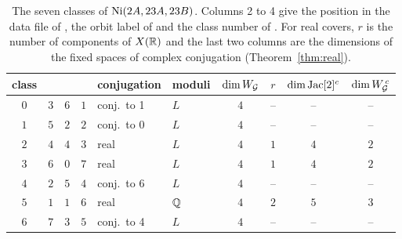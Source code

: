 \begin{table}[ht]
\centering\small
\begin{tabular}{@{}ccccllcccc@{}}
\toprule
class & \cite{HJLPPZ26} & \cite{Janik26} & \cite{LeLay26} & conjugation & moduli & $\dim W_{\mathcal{G}}$ & $r$ & $\dim\operatorname{Jac}[2]^{c}$ & $\dim W_{\mathcal{G}}^{\,c}$\\
\midrule
$0$ & $3$ & $6$ & $1$ & conj.\ to 1 & $L$ & $4$ & -- & -- & --\\
$1$ & $5$ & $2$ & $2$ & conj.\ to 0 & $L$ & $4$ & -- & -- & --\\
$2$ & $4$ & $4$ & $3$ & real & $L$ & $4$ & $1$ & $4$ & $2$\\
$3$ & $6$ & $0$ & $7$ & real & $L$ & $4$ & $1$ & $4$ & $2$\\
$4$ & $2$ & $5$ & $4$ & conj.\ to 6 & $L$ & $4$ & -- & -- & --\\
$5$ & $1$ & $1$ & $6$ & real & $\mathbb{Q}$ & $4$ & $2$ & $5$ & $3$\\
$6$ & $7$ & $3$ & $5$ & conj.\ to 4 & $L$ & $4$ & -- & -- & --\\
\bottomrule
\end{tabular}
\caption{The seven classes of $\operatorname{Ni}(2A,23A,23B)$. Columns 2 to 4 give the position in the data file of \cite{HJLPPZ26}, the orbit label of \cite[Table~1]{Janik26} and the class number of \cite{LeLay26}. For real covers, $r$ is the number of components of $X(\mathbb{R})$ and the last two columns are the dimensions of the fixed spaces of complex conjugation (Theorem~\ref{thm:real}).}
\label{tab:nielsen}
\end{table}
